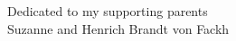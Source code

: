 \newpage
\vspace*{8cm}
\begin{center}
    \large Dedicated to my supporting parents\\
    Suzanne and Henrich Brandt von Fackh
\end{center}